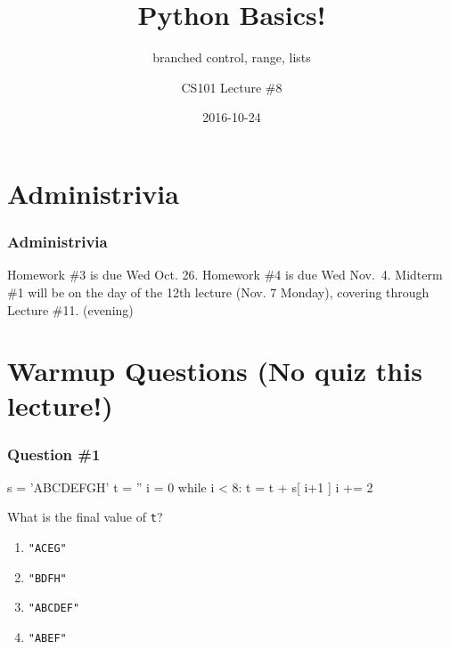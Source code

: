 \documentclass[11pt]{beamer}
\title{Python Basics!}
\subtitle{branched control, range, lists}
\author{CS101 Lecture \#8}
\date{2016-10-24}
\begin{document}
  \setcounter{showProgressBar}{0}
  \setcounter{showSlideNumbers}{0}

\frame{\titlepage}

\setcounter{framenumber}{0}
\setcounter{showProgressBar}{1}
\setcounter{showSlideNumbers}{1}

\section{Administrivia}

\begin{frame}
  \frametitle{Administrivia}
  \Enlarge
  \begin{itemize}
  \myitem  Homework \#3 is due Wed Oct. 26.
  \myitem  Homework \#4 is due Wed Nov.\ 4.
  \myitem Midterm \#1 will be on the day of the 12th lecture (Nov. 7 Monday), covering through Lecture \#11. (evening)
  \end{itemize}
\end{frame}

\section{Warmup Questions (No quiz this lecture!)}

\begin{frame}[fragile]
  \frametitle{Question \#1}
  \Enlarge

  \begin{semiverbatim}
s = 'ABCDEFGH'
t = ''
i = 0
while i < 8:
    t = t + s[ i+1 ]
    i += 2
  \end{semiverbatim}
  What is the final value of \texttt{t}?
  \begin{enumerate}[label=\Alph*]
  \item  \texttt{"ACEG"}
  \item  \texttt{"BDFH"} %
  \item  \texttt{"ABCDEF"}
  \item  \texttt{"ABEF"}
  \end{enumerate}
\end{frame}
\end{document}

